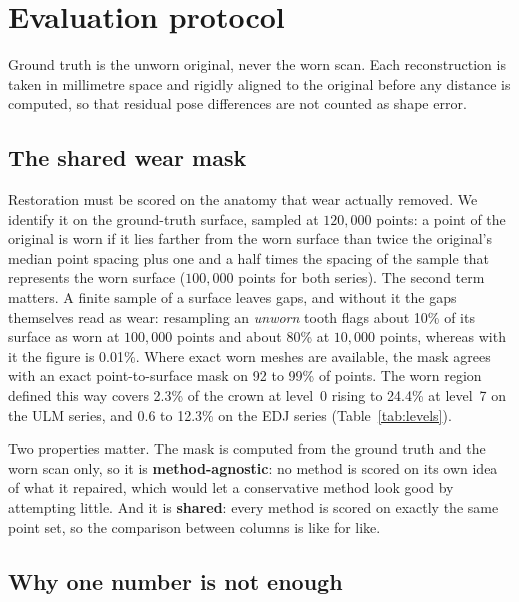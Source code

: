 \documentclass[10pt,a4paper,twocolumn]{article}
\begin{document}
\section{Evaluation protocol}
\label{sec:protocol}

Ground truth is the unworn original, never the worn scan. Each reconstruction is
taken in millimetre space and rigidly aligned to the original before any distance
is computed, so that residual pose differences are not counted as shape error.

\subsection{The shared wear mask}

Restoration must be scored on the anatomy that wear actually removed. We identify
it on the ground-truth surface, sampled at $120{,}000$ points: a point of the
original is worn if it lies farther from the worn surface than twice the
original's median point spacing plus one and a half times the spacing of the
sample that represents the worn surface ($100{,}000$ points for both series). The
second term matters. A finite sample of a surface leaves gaps, and without it the
gaps themselves read as wear: resampling an \emph{unworn} tooth flags about
10\% of its surface as worn at $100{,}000$ points and about 80\% at
$10{,}000$ points, whereas with it the figure is 0.01\%. Where exact worn meshes
are available, the mask agrees with an exact point-to-surface mask on 92 to 99\%
of points. The worn region defined this way covers 2.3\% of the crown at level~0
rising to 24.4\% at level~7 on the ULM series, and 0.6 to 12.3\% on the EDJ
series (Table~\ref{tab:levels}).

Two properties matter. The mask is computed from the ground truth and the worn
scan only, so it is \textbf{method-agnostic}: no method is scored on its own idea
of what it repaired, which would let a conservative method look good by
attempting little. And it is \textbf{shared}: every method is scored on exactly
the same point set, so the comparison between columns is like for like.

\subsection{Why one number is not enough}
\end{document}
